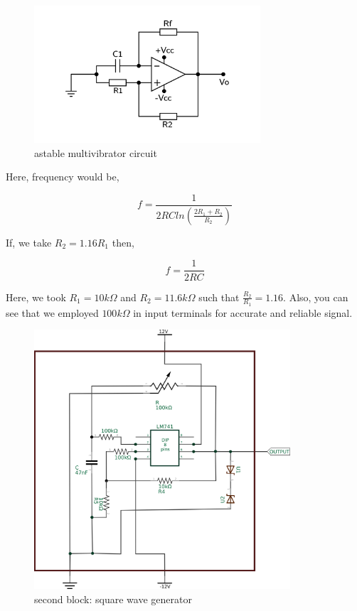 \documentclass[14pt,a4paper]{extarticle}
\begin{document}
\begin{figure}[H]
    \centering
    \label{square}
    \includegraphics[width=0.75\textwidth]{imgs/square.png}
    \caption{astable multivibrator circuit}
\end{figure}
Here, frequency would be, 

\begin{equation}
\label{eq:org54e2ba3}
  f =\frac{1}{2 RC ln(\frac{2R_{1}+R_{2}}{R_{2}})}
\end{equation}

If, we take \(R_{2}=1.16R_{1}\) then, 

\begin{equation}
\label{eq:org2626dbb}
  f =\frac{1}{2RC}
\end{equation}


Here, we took \(R_{1} = 10k\Omega\) and \(R_{2} = 11.6k\Omega\) such that \(\frac{R_{2}}{R_{1}}=1.16\). Also, you can see that we employed \(100k\Omega\) in input terminals for accurate and reliable signal.

\begin{figure}[H]
    \centering
    \label{squarereal}
    \includegraphics[width=0.85\textwidth]{imgs/squarereal.png}
    \caption{second block: square wave generator}
\end{figure}
\end{document}
